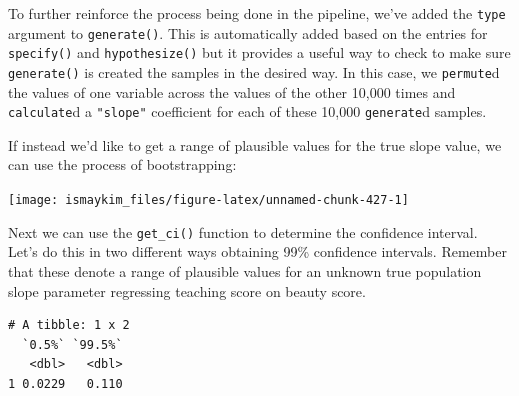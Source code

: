 \documentclass[12pt,]{krantz}
\makeatletter
\newenvironment{Shaded}{\begin{snugshade}}{\end{snugshade}}
\newcommand{\KeywordTok}[1]{\textcolor[rgb]{0.27,0.27,0.27}{\textbf{#1}}}
\newcommand{\DataTypeTok}[1]{\textcolor[rgb]{0.27,0.27,0.27}{#1}}
\newcommand{\FloatTok}[1]{\textcolor[rgb]{0.06,0.06,0.06}{#1}}
\newcommand{\StringTok}[1]{\textcolor[rgb]{0.5,0.5,0.5}{#1}}
\newcommand{\OperatorTok}[1]{\textcolor[rgb]{0.43,0.43,0.43}{\textbf{#1}}}
\newcommand{\NormalTok}[1]{#1}
\newenvironment{kframe}{%
\medskip{}
\setlength{\fboxsep}{.8em}
 \def\at@end@of@kframe{}%
 \ifinner\ifhmode%
  \def\at@end@of@kframe{\end{minipage}}%
  \begin{minipage}{\columnwidth}%
 \fi\fi%
 \def\FrameCommand##1{\hskip\@totalleftmargin \hskip-\fboxsep
 \colorbox{shadecolor}{##1}\hskip-\fboxsep
     \hskip-\linewidth \hskip-\@totalleftmargin \hskip\columnwidth}%
 \MakeFramed {\advance\hsize-\width
   \@totalleftmargin\z@ \linewidth\hsize
   \@setminipage}}%
 {\par\unskip\endMakeFramed%
 \at@end@of@kframe}
\renewenvironment{Shaded}{\begin{kframe}}{\end{kframe}}
\theoremstyle{definition}
\theoremstyle{definition}
\theoremstyle{definition}
\theoremstyle{remark}
\makeatother
\begin{document}
To further reinforce the process being done in the pipeline, we've added
the \texttt{type} argument to \texttt{generate()}. This is automatically
added based on the entries for \texttt{specify()} and
\texttt{hypothesize()} but it provides a useful way to check to make
sure \texttt{generate()} is created the samples in the desired way. In
this case, we \texttt{permute}d the values of one variable across the
values of the other 10,000 times and \texttt{calculate}d a
\texttt{"slope"} coefficient for each of these 10,000 \texttt{generate}d
samples.

If instead we'd like to get a range of plausible values for the true
slope value, we can use the process of bootstrapping:

\begin{Shaded}
\end{Shaded}

\begin{center}\texttt{[image: ismaykim\_files/figure-latex/unnamed-chunk-427-1]} \end{center}

Next we can use the \texttt{get\_ci()} function to determine the
confidence interval. Let's do this in two different ways obtaining 99\%
confidence intervals. Remember that these denote a range of plausible
values for an unknown true population slope parameter regressing
teaching score on beauty score.

\begin{Shaded}
\end{Shaded}

\begin{verbatim}
# A tibble: 1 x 2
  `0.5%` `99.5%`
   <dbl>   <dbl>
1 0.0229   0.110
\end{verbatim}

\begin{Shaded}
\end{Shaded}
\end{document}
